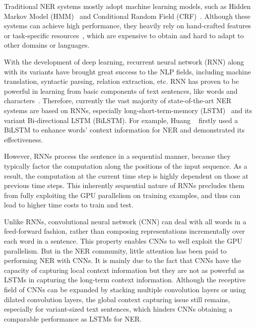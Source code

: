 \documentclass[letterpaper]{article} \usepackage{aaai19}  \usepackage{times}  \usepackage{helvet}  \usepackage{courier}  \usepackage{url}  \usepackage{graphicx}  \usepackage{amsmath}
\newcommand{\etal}{\text{et al.}}
\begin{document}
Traditional NER systems mostly adopt machine learning models, such as Hidden Markov Model (HMM)~\cite{bikel1997nymble} and Conditional Random Field (CRF)~\cite{mccallum2003early}. Although these systems can achieve high performance, they heavily rely on hand-crafted features or task-specific resources~\cite{ma2016CNNBLSTMCRF}, which are expensive to obtain and hard to adapt to other domains or languages.

With the development of deep learning, recurrent neural network (RNN) along with its variants have brought great success to the NLP fields, including machine translation, syntactic parsing, relation extraction, etc. RNN has proven to be powerful in learning from basic components of text sentences, like words and characters~\cite{tran2017named}. Therefore, currently the vast majority of state-of-the-art NER systems are based on RNNs, especially long-short-term-memory (LSTM)~\cite{hochreiter1997long} and its variant Bi-directional LSTM (BiLSTM). For example, Huang \etal~ firstly used a BiLSTM to enhance words' context information for NER and demonstrated its effectiveness. 

However, RNNs process the sentence in a sequential manner, because they typically factor the computation along the positions of the input sequence. As a result, the computation at the current time step is highly dependent on those at previous time steps. This inherently sequential nature of RNNs precludes them from fully exploiting the GPU parallelism on training examples, and thus can lead to higher time costs to train and test.

Unlike RNNs, convolutional neural network (CNN) can deal with all words in a feed-forward fashion, rather than composing representations incrementally over each word in a sentence. This property enables CNNs to well exploit the GPU parallelism. But in the NER community, little attention has been paid to performing NER with CNNs. It is mainly due to the fact that CNNs have the capacity of capturing local context information but they are not as powerful as LSTMs in capturing the long-term context information. Although the receptive field of CNNs can be expanded by stacking multiple convolution layers or using dilated convolution layers, the global context capturing issue still remains, especially for variant-sized text sentences, which hinders CNNs obtaining a comparable performance as LSTMs for NER.
\end{document}
